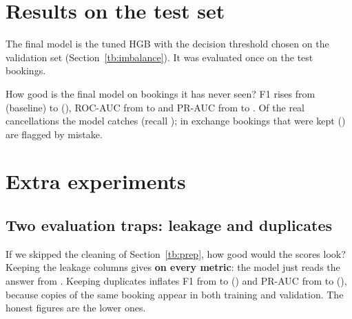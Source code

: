 \section{Results on the test set}\label{tb:results}
The final model is the tuned HGB with the decision threshold chosen on the validation set (Section~\ref{tb:imbalance}).
It was evaluated once on the \TBTest{} test bookings.

\begin{table}[H]\centering\small
\caption{Test-set results of the baseline and the final model.}\label{tb:tab-test}

\end{table}

\begin{finding}
\Q How good is the final model on bookings it has never seen?
\F F1 rises from \TBTestLrF{} (baseline) to \textbf{\TBTestFinF} (\TBGainF), ROC-AUC from \TBTestLrROC{} to
\textbf{\TBTestFinROC} and PR-AUC from \TBTestLrPR{} to \textbf{\TBTestFinPR}. Of the \TBPositives{} real cancellations
the model catches \TBTP{} (recall \TBTestFinR); in exchange \TBFP{} bookings that were kept (\TBFPRate) are flagged by mistake.
\end{finding}

\section{Extra experiments}\label{tb:extra}
\subsection{Two evaluation traps: leakage and duplicates}\label{tb:traps}
\begin{table}[H]\centering\small
\caption{Validation scores of the same HGB model under three data-handling scenarios.}\label{tb:tab-pitfalls}

\end{table}
\begin{finding}
\Q If we skipped the cleaning of Section~\ref{tb:prep}, how good would the scores look?
\F Keeping the leakage columns gives \textbf{\TBLeakF{} on every metric}: the model just reads the answer from
. Keeping duplicates inflates F1 from \TBCorrectF{} to \TBNodupF{} (\TBNodupGainF) and PR-AUC from
\TBCorrectPR{} to \TBNodupPR{} (\TBNodupGainPR), because copies of the same booking appear in both training and validation.
The honest figures are the lower ones.
\end{finding}

